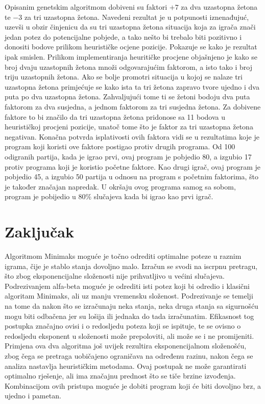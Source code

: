 \documentclass[times, utf8, seminar, numeric, tikz]{fer}
\begin{document}
Opisanim genetskim algoritmom dobiveni su faktori $+7$ za dva uzastopna žetona te $-3$ za tri uzastopna žetona. Navedeni rezultat je u potpunosti iznenađujuć, uzevši u obzir činjenicu da su tri uzastopna žetona situacija koja za igrača znači jedan potez do potencijalne pobjede, a tako nešto bi trebalo biti pozitivno i donositi bodove prilikom heurističke ocjene pozicije. Pokazuje se kako je rezultat ipak smislen. Prilikom implementiranja heuritičke procjene objašnjeno je kako se broj dvaju uzastopnih žetona množi odgovarajućim faktorom, a isto tako i broj triju uzastopnih žetona. Ako se bolje promotri situacija u kojoj se nalaze tri uzastopna žetona primjećuje se kako ista ta tri žetona zapravo tvore ujedno i dva puta po dva uzastopna žetona. Zahvaljujući tome ti se žetoni bodoju dva puta faktorom za dva susjedna, a jednom faktorom za tri susjedna žetona. Za dobivene faktore to bi značilo da tri uzastopna žetona pridonose sa 11 bodova u heurističkoj procjeni pozicije, unatoč tome što je faktor za tri uzastopna žetona negativan. Konačna potvrda isplativosti ovih faktora vidi se u rezultatima koje je program koji koristi ove faktore postigao protiv drugih programa. Od 100 odigranih partija, kada je igrao prvi, ovaj program je pobjedio 80, a izgubio 17 protiv programa koji je koristio početne faktore. Kao drugi igrač, ovaj program je pobjedio 45, a izgubio 50 partija u odnosu na program s početnim faktorima, što je također značajan napredak. U okršaju ovog programa samog sa sobom, program je pobijedio u $80\%$ slučajeva kada bi igrao kao prvi igrač. 


\chapter{Zaključak}

Algoritmom Minimaks moguće je točno odrediti optimalne poteze u raznim igrama, čije je stablo stanja dovoljno malo. Izračun se svodi na iscrpnu pretragu, što zbog eksponencijalne složenosti nije prihvatljivo u većini slučajeva. Podrezivanjem alfa-beta moguće je odrediti isti potez koji bi odredio i klasični algoritam Minimaks, ali uz manju vremensku složenost. Podrezivanje se temelji na tome da nakon što se izračunaju neka stanja, neka druga stanja sa sigurnošću mogu biti odbačena jer su lošija ili jednaka do tada izračunatim. Efikasnost tog postupka značajno ovisi i o redosljedu poteza koji se ispituje, te se ovisno o redosljedu eksponent u složenosti može prepoloviti, ali može se i ne promijeniti.\\

Primjena ova dva algoritma još uvijek rezultira eksponencijalnom složenošću, zbog čega se pretraga uobičajeno ograničava na određenu razinu, nakon čega se analiza nastavlja heurističkim metodama. Ovaj postupak ne može garantirati optimalno rješenje, ali ima značajnu prednost što se tiče brzine izvođenja. Kombinacijom ovih pristupa moguće je dobiti program koji će biti dovoljno brz, a ujedno i pametan.



\end{document}
